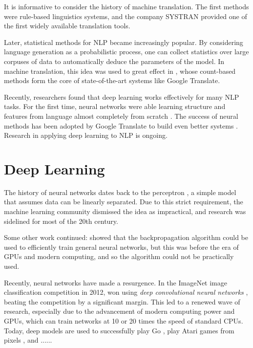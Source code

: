 \documentclass[11pt]{report}
\begin{document}
It is informative to consider the history of machine translation. The first methods were rule-based linguistics systems, and the company SYSTRAN provided one of the first widely available translation tools. %

Later, statistical methods for NLP became increasingly popular. By considering language generation as a probabilistic process, one can collect statistics over large corpuses of data to automatically deduce the parameters of the model. In machine translation, this idea was used to great effect in \citet{Brown1993}, whose count-based methods form the core of state-of-the-art systems like Google Translate.

Recently, researchers found that deep learning works effectively for many NLP tasks. For the first time, neural networks were able learning structure and features from language almost completely from scratch \citep{Collobert2011}. %
The success of neural methods has been adopted by Google Translate to build even better systems \citep{GoogleTranslate2016}. Research in applying deep learning to NLP is ongoing.

\section{Deep Learning}

The history of neural networks dates back to the perceptron \citep{Rosenblatt1958}, a simple model that assumes data can be linearly separated. Due to this strict requirement, the machine learning community dismissed the idea as impractical, and research was sidelined for most of the 20th century.

Some other work continued: \citet{Rumelhart1986} showed that the backpropagation algorithm could be used to efficiently train general neural networks, but this was before the era of GPUs and modern computing, and so the algorithm could not be practically used.

Recently, neural networks have made a resurgence. In the ImageNet image classification competition in 2012, \citet{Krizhevsky2012} won using \emph{deep convolutional neural networks} \citep{LeCun1995}, beating the competition by a significant margin. This led to a renewed wave of research, especially due to the advancement of modern computing power and GPUs, which can train networks at 10 or 20 times the speed of standard CPUs. Today, deep models are used to successfully play Go \citep{Silver2016}, play Atari games from pixels \citep{deepatari2015}, and ...... %
\end{document}
